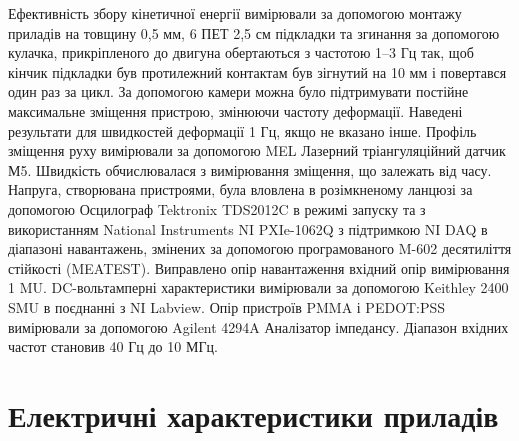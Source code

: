 \documentclass[a4paper,14pt]{extreport}
\begin{document}
Ефективність збору кінетичної енергії вимірювали за допомогою
монтажу приладів на товщину 0,5 мм, 6 ПЕТ 2,5 см
підкладки та згинання за допомогою кулачка, прикріпленого до двигуна
обертаються з частотою 1–3 Гц так, щоб кінчик підкладки був протилежний контактам
був зігнутий на 10 мм і повертався один раз за цикл. За допомогою камери
можна було підтримувати постійне максимальне зміщення
пристрою, змінюючи частоту деформації. Наведені результати для швидкостей деформації 1 Гц, якщо не вказано інше.
Профіль зміщення руху вимірювали за допомогою MEL
Лазерний тріангуляційний датчик М5. Швидкість обчислювалася з
вимірювання зміщення, що залежать від часу. Напруга, створювана пристроями, була вловлена в розімкненому ланцюзі за допомогою
Осцилограф Tektronix TDS2012C в режимі запуску та з використанням National Instruments NI PXIe-1062Q з підтримкою NI DAQ
в діапазоні навантажень, змінених за допомогою програмованого M-602
десятиліття стійкості (MEATEST). Виправлено опір навантаження
вхідний опір вимірювання 1 MU.
DC-вольтамперні характеристики вимірювали за допомогою
Keithley 2400 SMU в поєднанні з NI Labview. Опір
пристроїв PMMA і PEDOT:PSS вимірювали за допомогою Agilent
4294A Аналізатор імпедансу. Діапазон вхідних частот становив 40
Гц до 10 МГц.


\chapter{Електричні характеристики приладів}\par 
\end{document}
